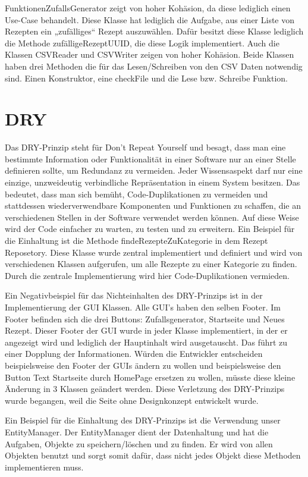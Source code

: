 FunktionenZufallsGenerator zeigt von hoher Kohäsion, da diese lediglich einen Use-Case behandelt. Diese Klasse hat lediglich die Aufgabe, aus einer Liste von Rezepten ein „zufälliges“ Rezept auszuwählen. Dafür besitzt diese Klasse lediglich die Methode zufälligeRezeptUUID, die diese Logik implementiert. Auch die Klassen CSVReader und CSVWriter zeigen von hoher Kohäsion. Beide Klassen haben drei Methoden die für das Lesen/Schreiben von den CSV Daten notwendig sind. Einen Konstruktor, eine checkFile und die Lese bzw. Schreibe Funktion. 

\section{DRY}\label{DRY}
Das DRY-Prinzip steht für \glqq Don't Repeat Yourself \grqq{} und besagt, dass man eine bestimmte Information oder Funktionalität in einer Software nur an einer Stelle definieren sollte, um Redundanz zu vermeiden. Jeder Wissensaspekt darf nur eine einzige, unzweideutig verbindliche Repräsentation in einem
System besitzen. Das bedeutet, dass man sich bemüht, Code-Duplikationen zu vermeiden und stattdessen wiederverwendbare Komponenten und Funktionen zu schaffen, die an verschiedenen Stellen in der Software verwendet werden können. Auf diese Weise wird der Code einfacher zu warten, zu testen und zu erweitern.
Ein Beispiel für die Einhaltung ist die Methode findeRezepteZuKategorie in dem Rezept Reposetory. Diese Klasse wurde zentral implementiert und definiert und wird von verschiedenen Klassen aufgerufen, um alle Rezepte zu einer Kategorie zu finden. Durch die zentrale Implementierung wird hier Code-Duplikationen vermieden. 

Ein Negativbeispiel für das Nichteinhalten des DRY-Prinzips ist in der Implementierung der GUI Klassen. Alle GUI's haben den selben Footer. Im Footer befinden sich die drei Buttons: Zufallsgenerator, Startseite und Neues Rezept. Dieser Footer der GUI wurde in jeder Klasse implementiert, in der er angezeigt wird und lediglich der Hauptinhalt wird ausgetauscht. Das führt zu einer Dopplung der Informationen. Würden die Entwickler entscheiden beispielsweise den Footer der GUIs ändern zu wollen und beispielsweise den Button Text Startseite durch HomePage ersetzen zu wollen, müsste diese kleine Änderung in 3 Klassen geändert werden. Diese Verletzung des DRY-Prinzips wurde begangen, weil die Seite ohne Designkonzept entwickelt wurde.  

Ein Beispiel für die Einhaltung des DRY-Prinzips ist die Verwendung unser EntityManager. Der EntityManager dient der Datenhaltung und hat die Aufgaben, Objekte zu speichern/löschen und zu finden. Er wird von allen Objekten benutzt und sorgt somit dafür, dass nicht jedes Objekt diese Methoden implementieren muss. 

